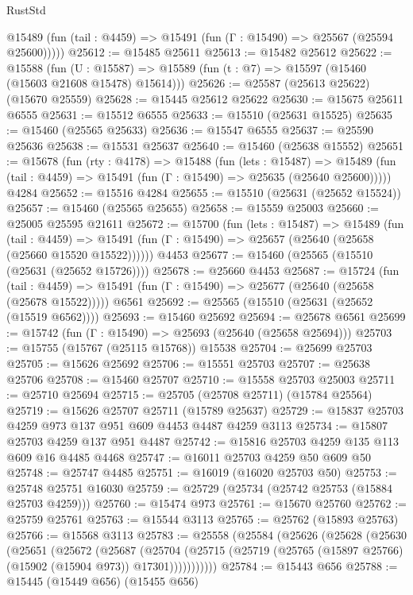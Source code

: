 \begin{lexlean}{RustStd}
\begin{coremodule}
      @15489 (fun (tail : @4459) => @15491 (fun (Γ : @15490) => @25567 (@25594 @25600)))))
@25612 := @15485 @25611
@25613 := @15482 @25612
@25622 := @15588
    (fun (U : @15587) => @15589 (fun (t : @7) => @15597 (@15460 (@15603 @21608 @15478) @15614)))
@25626 := @25587 (@25613 @25622) (@15670 @25559)
@25628 := @15445 @25612 @25622
@25630 := @15675 @25611 @6555
@25631 := @15512 @6555
@25633 := @15510 (@25631 @15525)
@25635 := @15460 (@25565 @25633)
@25636 := @15547 @6555
@25637 := @25590 @25636
@25638 := @15531 @25637
@25640 := @15460 (@25638 @15552)
@25651 := @15678
    (fun (rty : @4178) =>
    @15488
      (fun (lets : @15487) =>
      @15489 (fun (tail : @4459) => @15491 (fun (Γ : @15490) => @25635 (@25640 @25600)))))
    @4284
@25652 := @15516 @4284
@25655 := @15510 (@25631 (@25652 @15524))
@25657 := @15460 (@25565 @25655)
@25658 := @15559 @25003
@25660 := @25005 @25595 @21611
@25672 := @15700
    (fun (lets : @15487) =>
    @15489
      (fun (tail : @4459) =>
      @15491 (fun (Γ : @15490) => @25657 (@25640 (@25658 (@25660 @15520 @15522))))))
    @4453
@25677 := @15460 (@25565 (@15510 (@25631 (@25652 @15726))))
@25678 := @25660 @4453
@25687 := @15724
    (fun (tail : @4459) => @15491 (fun (Γ : @15490) => @25677 (@25640 (@25658 (@25678 @15522)))))
    @6561
@25692 := @25565 (@15510 (@25631 (@25652 (@15519 @6562))))
@25693 := @15460 @25692
@25694 := @25678 @6561
@25699 := @15742 (fun (Γ : @15490) => @25693 (@25640 (@25658 @25694)))
@25703 := @15755 (@15767 (@25115 @15768)) @15538
@25704 := @25699 @25703
@25705 := @15626 @25692
@25706 := @15551 @25703
@25707 := @25638 @25706
@25708 := @15460 @25707
@25710 := @15558 @25703 @25003
@25711 := @25710 @25694
@25715 := @25705 (@25708 @25711) (@15784 @25564)
@25719 := @15626 @25707 @25711 (@15789 @25637)
@25729 := @15837 @25703 @4259 @973 @137 @951 @609 @4453 @4487 @4259 @3113
@25734 := @15807 @25703 @4259 @137 @951 @4487
@25742 := @15816 @25703 @4259 @135 @113 @609 @16 @4485 @4468
@25747 := @16011 @25703 @4259 @50 @609 @50
@25748 := @25747 @4485
@25751 := @16019 (@16020 @25703 @50)
@25753 := @25748 @25751 @16030
@25759 := @25729 (@25734 (@25742 @25753 (@15884 @25703 @4259)))
@25760 := @15474 @973
@25761 := @15670 @25760
@25762 := @25759 @25761
@25763 := @15544 @3113
@25765 := @25762 (@15893 @25763)
@25766 := @15568 @3113
@25783 := @25558
    (@25584
      (@25626
        (@25628
          (@25630
            (@25651
              (@25672
                (@25687
                  (@25704
                    (@25715 (@25719 (@25765 (@15897 @25766) (@15902 (@15904 @973)) @17301)))))))))))
@25784 := @15443 @656
@25788 := @15445 (@15449 @656) (@15455 @656)

\end{coremodule}
\end{lexlean}
